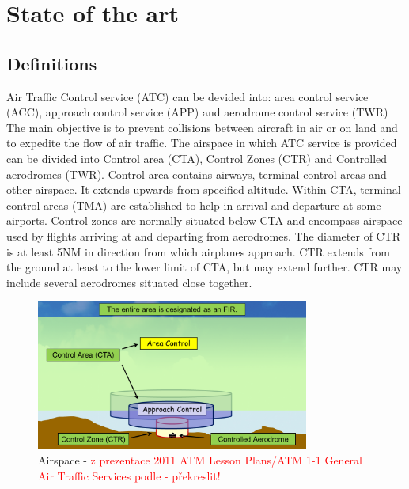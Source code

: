 \chapter{State of the art}
\section{Definitions}

Air Traffic Control service (ATC) can be devided into: area control service (ACC), approach control service (APP) and aerodrome control service (TWR) \cite[Chapter 1]{doc4444} The main objective is to prevent collisions between aircraft in air or on land and to expedite the flow of air traffic. \cite[Chapter 2.2]{annex11}
The airspace in which ATC service is provided can be divided into Control area (CTA), Control Zones (CTR) and Controlled aerodromes (TWR). Control area contains airways, terminal control areas and other airspace. It extends upwards from specified altitude. Within CTA, terminal control areas (TMA) are established to help in arrival and departure at some airports.
Control zones are normally situated below CTA and encompass airspace used by flights arriving at and departing from aerodromes. The diameter of CTR is at least 5NM in direction from which airplanes approach. CTR extends from the ground at least to the lower limit of CTA, but may extend further. CTR may include several aerodromes situated close together. \cite[Chapter 2.10]{annex11}

\begin{figure}[h]
    \centering
    \includegraphics[width=0.8\textwidth]{figures/airspace.png}
    \caption{Airspace - \textcolor{red}{z prezentace 2011 ATM Lesson Plans/ATM 1-1 General Air Traffic Services podle \cite[Chapter 2.5]{annex11} - překreslit!}}
    \label{fig:airspace}
\end{figure}

